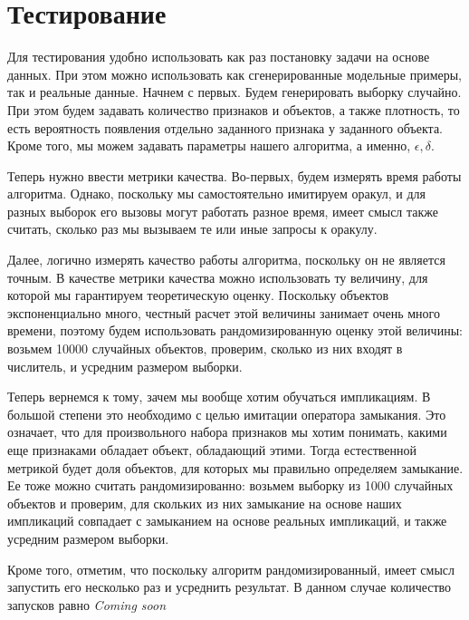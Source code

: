\section{Тестирование}

Для тестирования удобно использовать как раз постановку задачи на основе данных. При этом можно использовать как сгенерированные модельные примеры, так и реальные данные. Начнем с первых. Будем генерировать выборку случайно. При этом будем задавать количество признаков и объектов, а также плотность, то есть вероятность появления отдельно заданного признака у заданного объекта. Кроме того, мы можем задавать параметры нашего алгоритма, а именно, $\epsilon, \delta$.

Теперь нужно ввести метрики качества. Во-первых, будем измерять время работы алгоритма. Однако, поскольку мы самостоятельно имитируем оракул, и для разных выборок его вызовы могут работать разное время, имеет смысл также считать, сколько раз мы вызываем те или иные запросы к оракулу.

Далее, логично измерять качество работы алгоритма, поскольку он не является точным. В качестве метрики качества можно использовать ту величину, для которой мы гарантируем теоретическую оценку. Поскольку объектов экспоненциально много, честный расчет этой величины занимает очень много времени, поэтому будем использовать рандомизированную оценку этой величины: возьмем 10000 случайных объектов, проверим, сколько из них входят в числитель, и усредним размером выборки.

Теперь вернемся к тому, зачем мы вообще хотим обучаться импликациям. В большой степени это необходимо с целью имитации оператора замыкания. Это означает, что для произвольного набора признаков мы хотим понимать, какими еще признаками обладает объект, обладающий этими. Тогда естественной метрикой будет доля объектов, для которых мы правильно определяем замыкание. Ее тоже можно считать рандомизированно: возьмем выборку из 1000 случайных объектов и проверим, для скольких из них замыкание на основе наших импликаций совпадает с замыканием на основе реальных импликаций, и также усредним размером выборки.

Кроме того, отметим, что поскольку алгоритм рандомизированный, имеет смысл запустить его несколько раз и усреднить результат. В данном случае количество запусков равно %
\emph{Coming soon}
